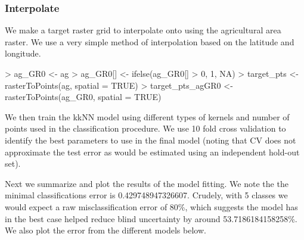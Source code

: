 \documentclass{article}
\begin{document}
\subsubsection{Interpolate}

We make a target raster grid to interpolate onto using the agricultural area raster. We use a very simple method of interpolation based on the latitude and longitude. 

\begin{Schunk}
\begin{Sinput}
> ag_GR0 <- ag
> ag_GR0[] <- ifelse(ag_GR0[] > 0, 1, NA)
> target_pts <- rasterToPoints(ag, spatial = TRUE)
> target_pts_agGR0 <- rasterToPoints(ag_GR0, spatial = TRUE)
\end{Sinput}
\end{Schunk}

We then train the kkNN model using different types of kernels and number of points used in the classification procedure. We use 10 fold cross validation to identify the best parameters to use in the final model (noting that CV does not approximate the test error as would be estimated using an independent hold-out set).

\begin{Schunk}
\end{Schunk}

Next we summarize and plot the results of the model fitting. We note the the minimal classifications error is 0.429748947326607. Crudely, with 5 classes we would expect a raw misclassification error of 80\%, which suggests the model has in the best case helped reduce blind uncertainty by around 53.7186184158258\%. We also plot the error from the different models below. 
\end{document}
